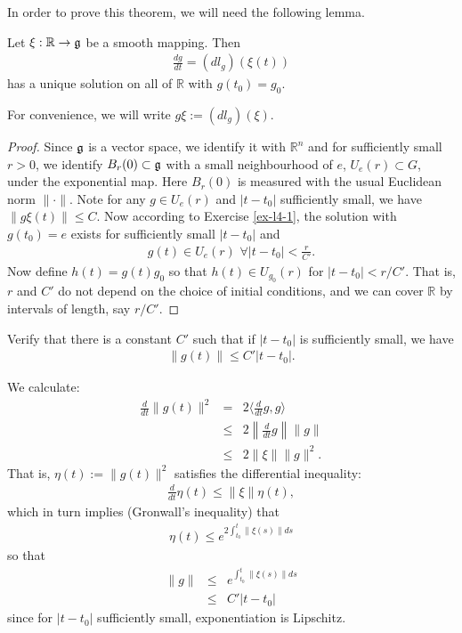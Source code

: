 In order to prove this theorem, we will need the following lemma.
\begin{lemma}
Let $\xi : \mathbb{R} \to \mathfrak{g}$ be a smooth mapping.  Then
\begin{eqnarray*}
\frac{dg}{dt} = (dl_g)(\xi(t))
\end{eqnarray*}
has a unique solution on all of $\mathbb{R}$ with $g(t_0) = g_0$.
\end{lemma}
For convenience, we will write $g \xi:= (dl_g)(\xi)$.
\begin{proof}
Since $\mathfrak{g}$ is a vector space, we identify it with $\mathbb{R}^n$ and for sufficiently
small $r>0$, we identify $B_r(0) \subset \mathfrak{g}$ with a small neighbourhood of $e$,
$U_e(r) \subset G$, under the exponential map.  Here $B_r(0)$ is measured with the
usual Euclidean norm $\| \cdot \|$.  Note for any $g \in U_e(r)$ and $|t-t_0|$
sufficiently small, we have $\|g \xi(t) \| \leq C$.  Now according to Exercise
\ref{ex-l4-1}, the solution with $g(t_0) = e$ exists for sufficiently small $|t-t_0|$
and
\begin{eqnarray*}
g(t) \in U_e(r) \,\, \forall |t-t_0| < \frac{r}{C'}.
\end{eqnarray*}
Now define $h(t) = g(t) g_0$ so that $h(t) \in U_{g_0}(r)$ for $|t-t_0| < r/C'$.  That
is, $r$ and $C'$ do not depend on the choice of initial conditions, and we can cover
$\mathbb{R}$ by intervals of length, say $r/C'$.
\end{proof}
\begin{exercise}
\label{ex-l4-1} Verify that there is a constant $C'$ such that if $|t-t_0|$ is
sufficiently small, we have
\begin{eqnarray*}
\|g(t)\| \leq C' |t-t_0|.
\end{eqnarray*}
  \begin{solution}
  We calculate:
  \begin{eqnarray*}
  \frac{d}{dt} \| g(t) \|^2 & = & 2 \langle \frac{d}{dt} g, g \rangle \\
  & \leq & 2\left\| \frac{d}{dt} g \right\|  \| g \|\\
  & \leq & 2\| \xi\| \| g \|^2.
  \end{eqnarray*}
  That is, $\eta(t) := \|g(t)\|^2$ satisfies the differential inequality:
  \begin{eqnarray*}
  \frac{d}{dt} \eta(t) \leq \|\xi\| \eta(t),
  \end{eqnarray*}
  which in turn implies (Gronwall's inequality) that
  \begin{eqnarray*}
  \eta(t)  \leq  e^{2\int_{t_0}^t \| \xi(s) \| ds}
  \end{eqnarray*}
  so that
  \begin{eqnarray*}
  \|g\| &  \leq & e^{\int_{t_0}^t \| \xi(s) \| ds} \\
  & \leq & C'|t - t_0|
  \end{eqnarray*}
  since for $|t-t_0|$ sufficiently small, exponentiation is Lipschitz.
  \end{solution}
\end{exercise}


